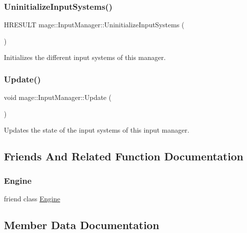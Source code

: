\subsubsection{\texorpdfstring{Uninitialize\+Input\+Systems()}{UninitializeInputSystems()}}
{\footnotesize\ttfamily H\+R\+E\+S\+U\+LT mage\+::\+Input\+Manager\+::\+Uninitialize\+Input\+Systems (\begin{DoxyParamCaption}{ }\end{DoxyParamCaption})\hspace{0.3cm}{\ttfamily [protected]}}

Initializes the different input systems of this manager. \hypertarget{classmage_1_1_input_manager_a5e516969ff4ae9876b98c28f48f93726}{}\label{classmage_1_1_input_manager_a5e516969ff4ae9876b98c28f48f93726} 
\subsubsection{\texorpdfstring{Update()}{Update()}}
{\footnotesize\ttfamily void mage\+::\+Input\+Manager\+::\+Update (\begin{DoxyParamCaption}{ }\end{DoxyParamCaption})\hspace{0.3cm}{\ttfamily [protected]}}

Updates the state of the input systems of this input manager. 

\subsection{Friends And Related Function Documentation}
\hypertarget{classmage_1_1_input_manager_a3e1914489e4bed4f9f23cdeab34a43dc}{}\label{classmage_1_1_input_manager_a3e1914489e4bed4f9f23cdeab34a43dc} 
\subsubsection{\texorpdfstring{Engine}{Engine}}
{\footnotesize\ttfamily friend class \hyperlink{classmage_1_1_engine}{Engine}\hspace{0.3cm}{\ttfamily [friend]}}



\subsection{Member Data Documentation}
\hypertarget{classmage_1_1_input_manager_a7341c72992efb7bee780111118f9589b}{}\label{classmage_1_1_input_manager_a7341c72992efb7bee780111118f9589b} 
